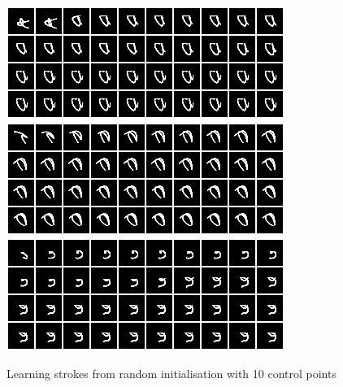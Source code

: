 \documentclass{article}
\begin{document}
\begin{figure}[htb!]
\includegraphics[scale=0.25]{../results/debug_recon/rand_init8_10.png}
\includegraphics[scale=0.25]{../results/debug_recon/rand_init9_10.png}
\includegraphics[scale=0.25]{../results/debug_recon/rand_init10_10.png}
\caption{Learning strokes from random initialisation with 10 control points}
\label{fig:shiftedinitrand10}
\end{figure}
\end{document}
